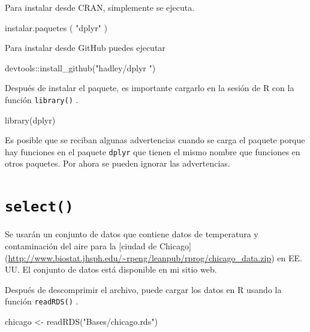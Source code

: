 \documentclass[
]{book}
\newenvironment{Shaded}{\begin{snugshade}}{\end{snugshade}}
\newcommand{\FunctionTok}[1]{\textcolor[rgb]{0.00,0.00,0.00}{#1}}
\newcommand{\NormalTok}[1]{#1}
\newcommand{\OtherTok}[1]{\textcolor[rgb]{0.56,0.35,0.01}{#1}}
\newcommand{\SpecialCharTok}[1]{\textcolor[rgb]{0.00,0.00,0.00}{#1}}
\newcommand{\StringTok}[1]{\textcolor[rgb]{0.31,0.60,0.02}{#1}}
\begin{document}
Para instalar desde CRAN, simplemente se ejecuta.

\begin{Shaded}
\begin{Highlighting}[]
\FunctionTok{instalar.paquetes}\NormalTok{ ( }\StringTok{"dplyr"}\NormalTok{ )}
\end{Highlighting}
\end{Shaded}

Para instalar desde GitHub puedes ejecutar

\begin{Shaded}
\begin{Highlighting}[]
\NormalTok{devtools}\SpecialCharTok{::}\FunctionTok{install\_github}\NormalTok{(}\StringTok{"hadley/dplyr "}\NormalTok{)}
\end{Highlighting}
\end{Shaded}

Después de instalar el paquete, es importante cargarlo en la sesión de R con la función \texttt{library()} .

\begin{Shaded}
\begin{Highlighting}[]
\FunctionTok{library}\NormalTok{(dplyr)}
\end{Highlighting}
\end{Shaded}

Es posible que se reciban algunas advertencias cuando se carga el paquete porque hay funciones en el paquete \texttt{dplyr} que tienen el mismo nombre que funciones en otros paquetes. Por ahora se pueden ignorar las advertencias.

\hypertarget{select}{%
\section{\texorpdfstring{\texttt{select()}}{select()}}\label{select}}

Se usarán un conjunto de datos que contiene datos de temperatura y contaminación del aire para la {[}ciudad de Chicago{]} (\url{http://www.biostat.jhsph.edu/~rpeng/leanpub/rprog/chicago_data.zip}) en EE. UU. El conjunto de datos está disponible en mi sitio web.

Después de descomprimir el archivo, puede cargar los datos en R usando la función \texttt{readRDS()} .

\begin{Shaded}
\begin{Highlighting}[]
\NormalTok{chicago }\OtherTok{\textless{}{-}} \FunctionTok{readRDS}\NormalTok{(}\StringTok{"Bases/chicago.rds"}\NormalTok{)}
\end{Highlighting}
\end{Shaded}
\end{document}
